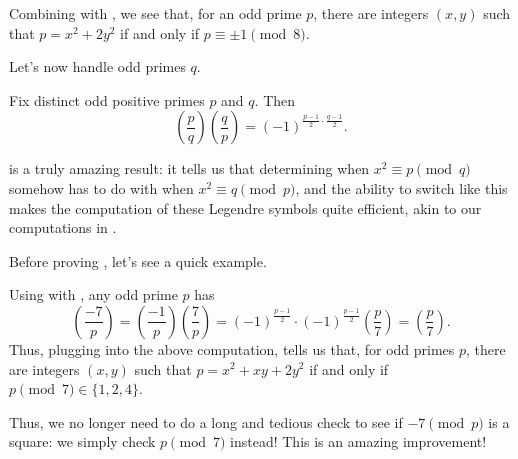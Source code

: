 \documentclass[../notes.tex]{subfiles}
\begin{document}
\begin{example}
	Combining  with , we see that, for an odd prime $p$, there are integers $(x,y)$ such that $p=x^2+2y^2$ if and only if $p\equiv\pm1\pmod8$.
\end{example}
Let's now handle odd primes $q$.
\begin{theorem} \label{thm:qr}
	Fix distinct odd positive primes $p$ and $q$. Then
	\[\left(\frac pq\right)\left(\frac qp\right)=(-1)^{\frac{p-1}2\cdot\frac{q-1}2}.\]
\end{theorem}
 is a truly amazing result: it tells us that determining when $x^2\equiv p\pmod q$ somehow has to do with when $x^2\equiv q\pmod p$, and the ability to switch like this makes the computation of these Legendre symbols quite efficient, akin to our computations in .

Before proving , let's see a quick example.
\begin{example}
	Using  with , any odd prime $p$ has
	\[\left(\frac{-7}p\right)=\left(\frac{-1}p\right)\left(\frac7p\right)=(-1)^{\frac{p-1}2}\cdot(-1)^{\frac{p-1}2}\left(\frac p7\right)=\left(\frac p7\right).\]
	Thus, plugging  into the above computation,  tells us that, for odd primes $p$, there are integers $(x,y)$ such that $p=x^2+xy+2y^2$ if and only if $p\pmod7\in\{1,2,4\}$.
\end{example}
Thus, we no longer need to do a long and tedious check to see if $-7\pmod p$ is a square: we simply check $p\pmod7$ instead! This is an amazing improvement!
\end{document}
